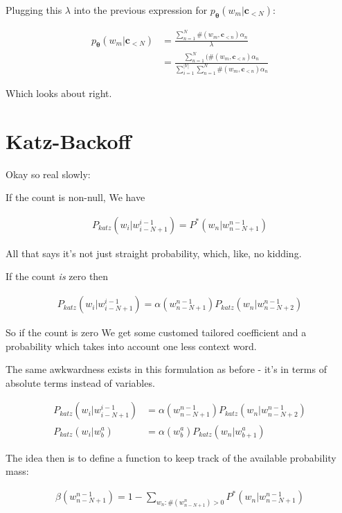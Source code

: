 \documentclass{article}
\newcommand{\vtheta}{\boldsymbol{\theta}}
\newcommand{\model}{p_{\vtheta}}
\newcommand{\context}{\boldsymbol{c}}
\begin{document}
			Plugging this $\lambda$ into the previous expression for $\model(w_m| \context_{<N})$:
			
			\begin{align}
				\model(w_m| \context_{<N})  &= \frac{\sum^N_{n=1} \#(w_m, \context_{<n})\alpha_n}{\lambda}\\
				&= \frac{\sum^N_{n=1} (\#(w_m, \context_{<n})\alpha_n}{\sum^{|V|}_{i=1} \sum^N_{n=1} \#(w_m, \context_{<n})\alpha_n}
			\end{align}
			
			Which looks about right.
			
\newpage		
\section{Katz-Backoff}

	Okay so real slowly:
	
	If the count is non-null, We have
	
	\begin{align}
		P_{katz}(w_i|w^{i-1}_{i-N+1}) = P^*(w_n|w^{n-1}_{n-N+1})
	\end{align}
	
	All that says it's not just straight probability, which, like, no kidding.
	
	If the count \textit{is} zero then
	
	\begin{align}
		P_{katz}(w_i|w^{i-1}_{i-N+1}) = \alpha(w^{n-1}_{n-N+1})P_{katz}(w_n|w^{n-1}_{n-N+2})
	\end{align}
	
	So if the count is zero We get some customed tailored coefficient and a probability which takes into account one less context word. 
	
	The same awkwardness exists in this formulation as before - it's in terms of absolute terms instead of variables. 
	
	\begin{align}
		P_{katz}(w_i|w^{i-1}_{i-N+1}) &= \alpha(w^{n-1}_{n-N+1})P_{katz}(w_n|w^{n-1}_{n-N+2})\\
		P_{katz}(w_i|w^{a}_{b}) &= \alpha(w^{a}_{b})P_{katz}(w_n|w^{a}_{b+1})
	\end{align}	
	
	The idea then is to define a function to keep track of the available probability mass:
	
	\begin{align}
		\beta(w^{n-1}_{n-N+1}) = 1 - \sum_{w_n:\#(w^n_{n-N+1})>0} P^*(w_n|w^{n-1}_{n-N+1})
	\end{align}
	
\end{document}
